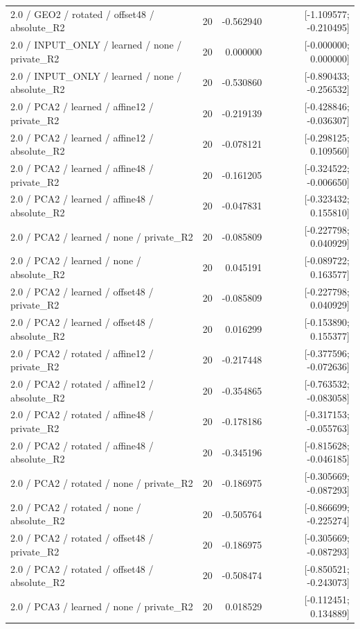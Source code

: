 \begin{longtable}{p{.56\linewidth}rrr}
2.0 / GEO2 / rotated / offset48 / absolute\_R2 & 20 & -0.562940 & [-1.109577; -0.210495] \\
2.0 / INPUT\_ONLY / learned / none / private\_R2 & 20 & 0.000000 & [-0.000000; 0.000000] \\
2.0 / INPUT\_ONLY / learned / none / absolute\_R2 & 20 & -0.530860 & [-0.890433; -0.256532] \\
2.0 / PCA2 / learned / affine12 / private\_R2 & 20 & -0.219139 & [-0.428846; -0.036307] \\
2.0 / PCA2 / learned / affine12 / absolute\_R2 & 20 & -0.078121 & [-0.298125; 0.109560] \\
2.0 / PCA2 / learned / affine48 / private\_R2 & 20 & -0.161205 & [-0.324522; -0.006650] \\
2.0 / PCA2 / learned / affine48 / absolute\_R2 & 20 & -0.047831 & [-0.323432; 0.155810] \\
2.0 / PCA2 / learned / none / private\_R2 & 20 & -0.085809 & [-0.227798; 0.040929] \\
2.0 / PCA2 / learned / none / absolute\_R2 & 20 & 0.045191 & [-0.089722; 0.163577] \\
2.0 / PCA2 / learned / offset48 / private\_R2 & 20 & -0.085809 & [-0.227798; 0.040929] \\
2.0 / PCA2 / learned / offset48 / absolute\_R2 & 20 & 0.016299 & [-0.153890; 0.155377] \\
2.0 / PCA2 / rotated / affine12 / private\_R2 & 20 & -0.217448 & [-0.377596; -0.072636] \\
2.0 / PCA2 / rotated / affine12 / absolute\_R2 & 20 & -0.354865 & [-0.763532; -0.083058] \\
2.0 / PCA2 / rotated / affine48 / private\_R2 & 20 & -0.178186 & [-0.317153; -0.055763] \\
2.0 / PCA2 / rotated / affine48 / absolute\_R2 & 20 & -0.345196 & [-0.815628; -0.046185] \\
2.0 / PCA2 / rotated / none / private\_R2 & 20 & -0.186975 & [-0.305669; -0.087293] \\
2.0 / PCA2 / rotated / none / absolute\_R2 & 20 & -0.505764 & [-0.866699; -0.225274] \\
2.0 / PCA2 / rotated / offset48 / private\_R2 & 20 & -0.186975 & [-0.305669; -0.087293] \\
2.0 / PCA2 / rotated / offset48 / absolute\_R2 & 20 & -0.508474 & [-0.850521; -0.243073] \\
2.0 / PCA3 / learned / none / private\_R2 & 20 & 0.018529 & [-0.112451; 0.134889] \\

\end{longtable}
